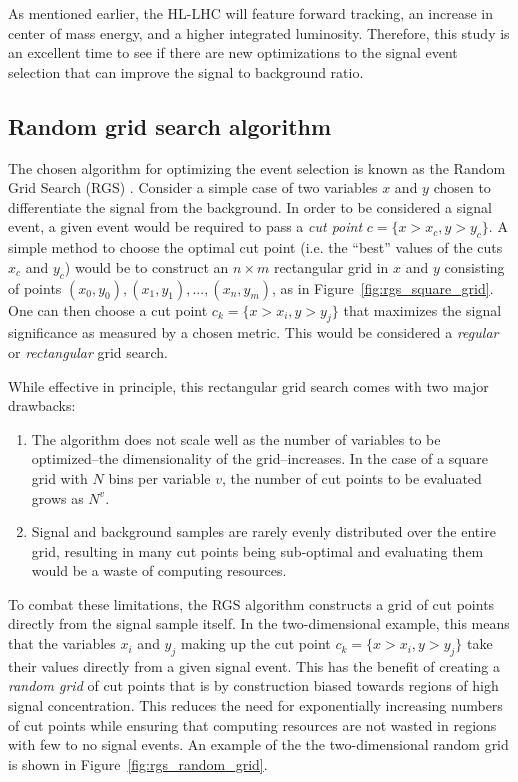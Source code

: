 As mentioned earlier, the HL-LHC will feature forward tracking, an increase in center of mass energy, and a higher integrated luminosity.
Therefore, this study is an excellent time to see if there are new optimizations to the signal event selection that can improve the signal to background ratio.

\subsection{Random grid search algorithm}\label{sswwupgrade:opt_rgs}
The chosen algorithm for optimizing the event selection is known as the Random Grid Search (RGS) \cite{2018.rgs-paper}.
Consider a simple case of two variables $x$ and $y$ chosen to differentiate the signal from the background.
In order to be considered a signal event, a given event would be required to pass a \emph{cut point} $c = \{x > x_c, y > y_c\}$.
A simple method to choose the optimal cut point (i.e. the ``best'' values of the cuts $x_c$ and $y_c$) would be to construct an $n\times m$ rectangular grid in $x$ and $y$ consisting of points $(x_0,y_0), (x_1,y_1), ..., (x_n,y_m)$, as in Figure~\ref{fig:rgs_square_grid}.
One can then choose a cut point $c_k = \{x > x_i, y > y_j\}$ that maximizes the signal significance as measured by a chosen metric.
This would be considered a \emph{regular} or \emph{rectangular} grid search.

While effective in principle, this rectangular grid search comes with two major drawbacks:
\begin{enumerate}
\item The algorithm does not scale well as the number of variables to be optimized--the dimensionality of the grid--increases.  In the case of a square grid with $N$ bins per variable $v$, the number of cut points to be evaluated grows as $N^v$.
\item Signal and background samples are rarely evenly distributed over the entire grid, resulting in many cut points being sub-optimal and evaluating them would be a waste of computing resources.
\end{enumerate}

To combat these limitations, the RGS algorithm constructs a grid of cut points directly from the signal sample itself.
In the two-dimensional example, this means that the variables $x_i$ and $y_j$ making up the cut point $c_k = \{x > x_i, y > y_j\}$ take their values directly from a given signal event.
This has the benefit of creating a \emph{random grid} of cut points that is by construction  biased towards regions of high signal concentration.
This reduces the need for exponentially increasing numbers of cut points while ensuring that computing resources are not wasted in regions with few to no signal events.
An example of the the two-dimensional random grid is shown in Figure~\ref{fig:rgs_random_grid}.

